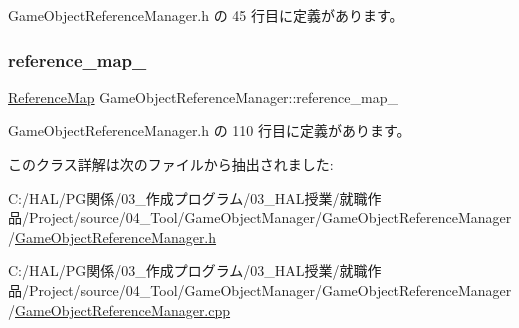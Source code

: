  Game\+Object\+Reference\+Manager.\+h の 45 行目に定義があります。

\mbox{\label{class_game_object_reference_manager_a1aa067e575ad467741f671fd867e5638}} 
\subsubsection{\texorpdfstring{reference\+\_\+map\+\_\+}{reference\_map\_}}
{\footnotesize\ttfamily \mbox{\hyperlink{struct_game_object_reference_manager_1_1_reference_map}{Reference\+Map}} Game\+Object\+Reference\+Manager\+::reference\+\_\+map\+\_\+\hspace{0.3cm}{\ttfamily [private]}}



 Game\+Object\+Reference\+Manager.\+h の 110 行目に定義があります。



このクラス詳解は次のファイルから抽出されました\+:\begin{DoxyCompactItemize}
\item 
C\+:/\+H\+A\+L/\+P\+G関係/03\+\_\+作成プログラム/03\+\_\+\+H\+A\+L授業/就職作品/\+Project/source/04\+\_\+\+Tool/\+Game\+Object\+Manager/\+Game\+Object\+Reference\+Manager/\mbox{\hyperlink{_game_object_reference_manager_8h}{Game\+Object\+Reference\+Manager.\+h}}\item 
C\+:/\+H\+A\+L/\+P\+G関係/03\+\_\+作成プログラム/03\+\_\+\+H\+A\+L授業/就職作品/\+Project/source/04\+\_\+\+Tool/\+Game\+Object\+Manager/\+Game\+Object\+Reference\+Manager/\mbox{\hyperlink{_game_object_reference_manager_8cpp}{Game\+Object\+Reference\+Manager.\+cpp}}\end{DoxyCompactItemize}
